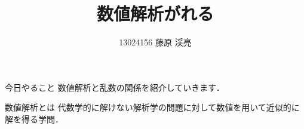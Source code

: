 \documentclass[a4j,dvipdfmx]{beamer}
\title{数値解析が\jruby{乱数}{み|だ}れる}
\author{13024156 藤原 渓亮}
\begin{document}
  \maketitle
  \begin{frame}{今日やること}
    数値解析と乱数の関係を紹介していきます．
  \end{frame}
  \begin{frame}{数値解析とは}
    代数学的に解けない解析学の問題に対して数値を用いて近似的に解を得る学問．
  \end{frame}
\end{document}
